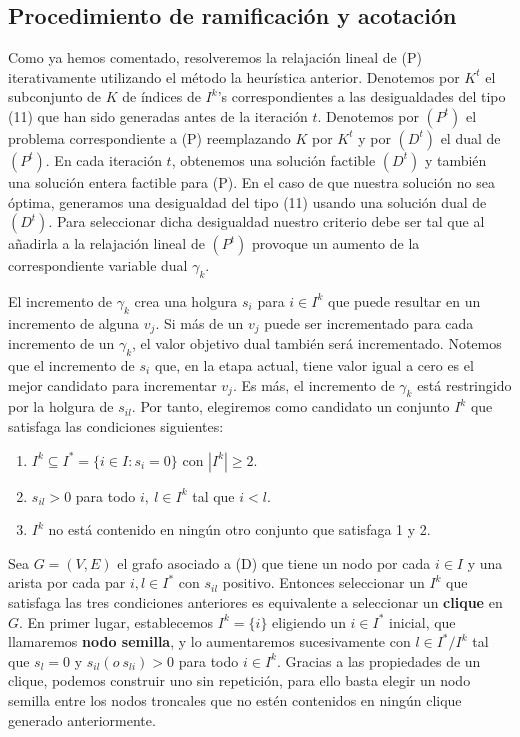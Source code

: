 \documentclass[twoside,12pt]{article}
\begin{document}
\subsection{Procedimiento de ramificación y acotación}
Como ya hemos comentado, resolveremos la relajación lineal de (P) iterativamente utilizando el método la heurística anterior. Denotemos por $K^t$ el subconjunto de $K$ de índices de $I^k$'s correspondientes a las desigualdades del tipo (11) que han sido generadas antes de la iteración $t$. Denotemos por $(P^t)$ el problema correspondiente a (P) reemplazando $K$ por $K^t$ y por $(D^t)$ el dual de $(P^t)$. En cada iteración $t$, obtenemos una solución factible $(D^t)$ y también una solución entera factible para (P). En el caso de que nuestra solución no sea óptima, generamos una desigualdad del tipo (11) usando una solución dual de $(D^t)$. Para seleccionar dicha desigualdad nuestro criterio debe ser tal que al añadirla a la relajación lineal de $(P^t)$ provoque un aumento de la correspondiente variable dual $\gamma_k$. 

El incremento de $\gamma_k$ crea una holgura $s_i$ para $i\in I^k$ que puede resultar en un incremento de alguna $v_j$. Si más de un $v_{j}$ puede ser incrementado para cada incremento de un $\gamma_{k}$, el valor objetivo dual también será incrementado. Notemos que el incremento de $s_{i}$ que, en la etapa actual, tiene valor igual a cero es el mejor candidato para incrementar $v_{j}$. Es más, el incremento de $\gamma_{k}$ está restringido por la holgura de $s_{il}$. Por tanto, elegiremos como candidato un conjunto $I^{k}$ que satisfaga las condiciones siguientes:
\begin{enumerate}[1.]
    \item $I^{k}\subseteq I^{*}=\{i\in I:s_{i}=0\}$ con $|I^{k}|\geq 2$.
    \item $s_{il}>0$ para todo $i, \ l\in I^{k}$ tal que $i<l$.
    \item $I^{k}$ no está contenido en ningún otro conjunto que satisfaga 1 y 2.
\end{enumerate}

Sea $G=(V,E)$ el grafo asociado a (D) que tiene un nodo por cada $i\in I$ y una arista por cada par $i,l \in I^{*}$ con $s_{il}$ positivo. Entonces seleccionar un $I^{k}$ que satisfaga las tres condiciones anteriores es equivalente a seleccionar un \textbf{clique} en $G$. En primer lugar, establecemos $I^{k}=\{i\}$ eligiendo un $i\in I^{*}$ inicial, que llamaremos \textbf{nodo semilla}, y lo aumentaremos sucesivamente con $l\in I^{*}/I^{k}$ tal que $s_{l}=0$ y $s_{il}(o\ s_{li})>0$ para todo $i\in I^{k}$. Gracias a las propiedades de un clique, podemos construir uno sin repetición, para ello basta elegir un nodo semilla entre los nodos troncales que no estén contenidos en ningún clique generado anteriormente.\\
\end{document}

